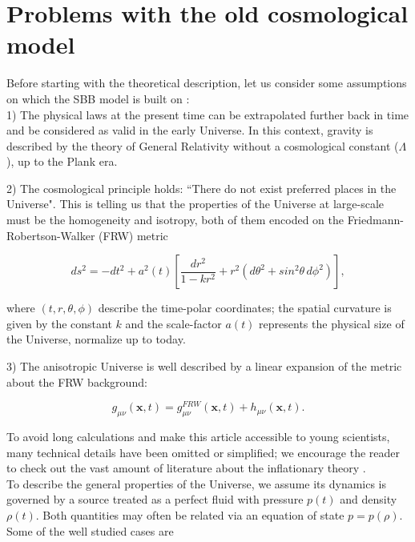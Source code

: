 \documentclass{rmaa}
\def\beq{\begin{equation}}
\def\eeq{\end{equation}}
\begin{document}
\section{Problems with the old
cosmological model}

Before starting with the theoretical description, let us consider some assumptions on which the
SBB model is built on \citep{Coles}:
\\ 

1) The physical laws at the present time can be extrapolated further back in time and be
 considered as valid in the early Universe. In this context, gravity is described by
 the theory of General Relativity without a cosmological constant ($\Lambda$), up to the Plank era.  

 2) The cosmological principle holds: ``There do not exist preferred places in the Universe".
 This is telling us that the properties of the Universe at large-scale must be the homogeneity and isotropy,
both of them encoded on the Friedmann-Robertson-Walker (FRW) metric

\begin{equation}
 ds^2= -dt^2 + a^2(t)\left[ \frac{dr^2}{1-kr^2} +r^2 (d\theta^2 +sin^2\theta\, d\phi^2) \right],
\end{equation}

\noindent
where $(t,r,\theta,\phi)$ describe the time-polar coordinates; the spatial curvature is given by the 
constant $k$ and the scale-factor $a(t)$ represents the physical size of the Universe, normalize up to
today.
  
 3) The anisotropic Universe is well described by a linear expansion of the metric about the 
 FRW background:
 
\beq \label{eq:metric}
g_{\mu \nu}(\textbf{x},t)= g_{\mu \nu}^{FRW}(\textbf{x},t)+h_{\mu \nu}(\textbf{x},t).
\eeq

To avoid long calculations and make this article accessible to young scientists, many 
technical details have been omitted or simplified; 
we encourage the reader to check out the vast amount of literature about the inflationary theory
 \citep{LiddleLyth, Liddle, Kolbbo, Dodelson, Lindeb}.
\\

To describe the general properties of the Universe, we assume its dynamics is governed by a source treated as a
perfect fluid with pressure $p(t)$ and density $\rho(t)$. Both quantities may often be related
via an equation of state $p=p(\rho)$. Some of the well studied cases are  
\end{document}
